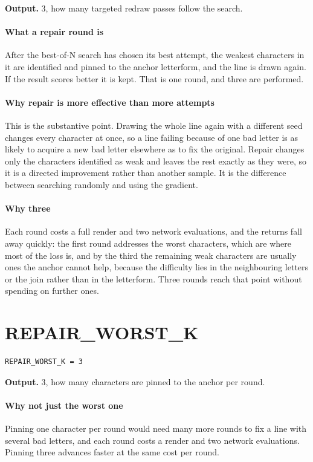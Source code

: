 \noindent\textbf{Output.} 3, how many targeted redraw passes follow the search.


\paragraph{What a repair round is}
After the best-of-N search has chosen its best attempt, the weakest characters in it are identified and pinned to the anchor letterform, and the line is drawn again. If the result scores better it is kept. That is one round, and three are performed.


\paragraph{Why repair is more effective than more attempts}
This is the substantive point. Drawing the whole line again with a different seed changes every character at once, so a line failing because of one bad letter is as likely to acquire a new bad letter elsewhere as to fix the original. Repair changes only the characters identified as weak and leaves the rest exactly as they were, so it is a directed improvement rather than another sample. It is the difference between searching randomly and using the gradient.


\paragraph{Why three}
Each round costs a full render and two network evaluations, and the returns fall away quickly: the first round addresses the worst characters, which are where most of the loss is, and by the third the remaining weak characters are usually ones the anchor cannot help, because the difficulty lies in the neighbouring letters or the join rather than in the letterform. Three rounds reach that point without spending on further ones.


\section{REPAIR\_WORST\_K}
\begin{lstlisting}[style=sig]
REPAIR_WORST_K = 3
\end{lstlisting}

\noindent\textbf{Output.} 3, how many characters are pinned to the anchor per round.


\paragraph{Why not just the worst one}
Pinning one character per round would need many more rounds to fix a line with several bad letters, and each round costs a render and two network evaluations. Pinning three advances faster at the same cost per round.


